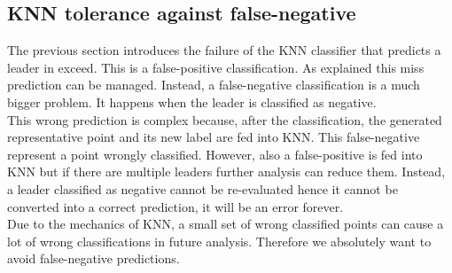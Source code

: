 \subsection{KNN tolerance against false-negative} \label{sec:knnToleranceToFN}
The previous section introduces the failure of the KNN classifier that predicts a leader in exceed. This is a false-positive classification. As explained this miss prediction can be managed. Instead, a false-negative classification is a much bigger problem. It happens when the leader is classified as negative.\\%
This wrong prediction is complex because, after the classification, the generated representative point and its new label are fed into KNN. This false-negative represent a point wrongly classified. However, also a false-positive is fed into KNN but if there are multiple leaders further analysis can reduce them. Instead, a leader classified as negative cannot be re-evaluated hence it cannot be converted into a correct prediction, it will be an error forever.\\
Due to the mechanics of KNN, a small set of wrong classified points can cause a lot of wrong classifications in future analysis. Therefore we absolutely want to avoid false-negative predictions.



